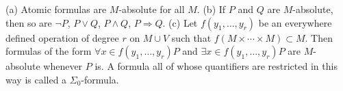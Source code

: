 (a) Atomic formulas are $M$-absolute for all $M$.
(b) If $P$ and $Q$ are $M$-absolute, then so are $\neg P$, $P \vee Q$, $P \wedge Q$, $P \Rightarrow Q$.
(c) Let $f(y_1, \ldots, y_r)$ be an everywhere defined operation of degree $r$ on $M \cup V$ such that $f(M \times \cdots \times M) \subset M$. Then formulas of the form $\forall x \in f(y_1, \ldots, y_r) P$ and $\exists x \in f(y_1, \ldots, y_r) P$ are $M$-absolute whenever $P$ is.
A formula all of whose quantifiers are restricted in this way is called a $\Sigma_0$-formula.